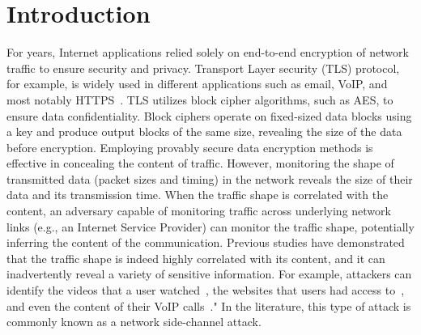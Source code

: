 
\chapter{Introduction}
\label{ch:introduction}

For years, Internet applications relied solely on end-to-end encryption of network traffic to ensure security and privacy.
Transport Layer security (TLS) protocol, for example, is widely used in different applications such as email, VoIP, and most notably HTTPS~\cite{rfc2818}.
TLS utilizes block cipher algorithms, such as AES, to ensure data confidentiality.
Block ciphers operate on fixed-sized data blocks using a key and produce output blocks of the same size, revealing the size of the data before encryption. 
Employing provably secure data encryption methods is effective in concealing the content of traffic.
However, monitoring the shape of transmitted data (\ie packet sizes and timing) in the network reveals the size of their data and its transmission time.
When the traffic shape is correlated with the content, an adversary capable of monitoring traffic across underlying network links (e.g., an Internet Service Provider) can monitor the traffic shape, potentially inferring the content of the communication.
Previous studies have demonstrated that the traffic shape is indeed highly correlated with its content, and it can inadvertently reveal a variety of sensitive information.
For example, attackers can identify the videos that a user watched~\cite{schuster2017beautyburst}, the websites that users had access to~\cite{wang2014supersequence, bhat2019varcnn}, and even the content of their VoIP calls~\cite{white2011phonotactic}."
In the literature, this type of attack is commonly known as a network side-channel attack.



